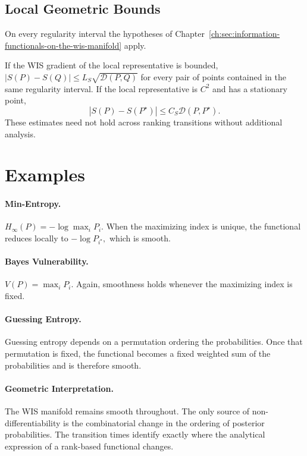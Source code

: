 \subsection{Local Geometric Bounds}\label{ch:cor:17-1}
On every regularity interval the hypotheses of Chapter~\ref{ch:sec:information-functionals-on-the-wis-manifold} apply.
\begin{corollary}

If the WIS gradient of the local representative is bounded,
$|S(P)-S(Q)| \le L_S \sqrt{\mathcal D(P,Q)}$
for every pair of points contained in the same regularity interval.
If the local representative is \(C^{2}\) and has a stationary point,
\[ |S(P)-S(P^{\star})| \le C_S
\mathcal D(P,P^{\star}). \]
These estimates need not hold across ranking transitions without
additional analysis.
\end{corollary}

\section{Examples}\label{ch:sec:examples}

\paragraph{Min-Entropy.}
\(H_\infty(P)=-\log\max_iP_i.\)
When the maximizing index is unique, the functional reduces locally to
\(-\log P_{i^{\star}},\) which is smooth.

\paragraph{Bayes Vulnerability.}
\(V(P)=\max_iP_i.\)
Again, smoothness holds whenever the maximizing index is fixed.

\paragraph{Guessing Entropy.}
Guessing entropy depends on a permutation ordering the probabilities.
Once that permutation is fixed, the functional becomes a fixed weighted
sum of the probabilities and is therefore smooth.
\paragraph{Geometric Interpretation.}
The WIS manifold remains smooth throughout.
The only source of non-differentiability is the combinatorial change in
the ordering of posterior probabilities.
The transition times identify exactly where the analytical expression of
a rank-based functional changes.


